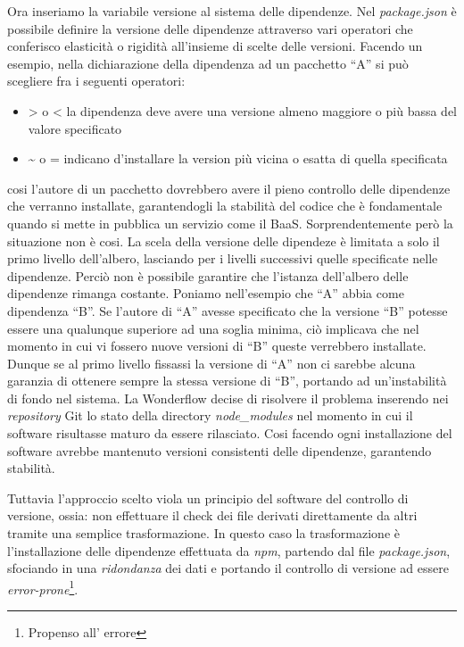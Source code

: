 Ora inseriamo la variabile versione al sistema delle dipendenze. Nel
\textit{package.json} è possibile definire la versione delle dipendenze
attraverso vari operatori che conferisco elasticità o rigidità all'insieme di
scelte delle versioni. Facendo un esempio, nella dichiarazione della dipendenza
ad un pacchetto ``A'' si può scegliere fra i seguenti operatori:
\begin{itemize}
  \item > o < la dipendenza deve avere una versione almeno maggiore o più bassa
  del valore specificato
  \item \~{} o = indicano d'installare la version più vicina o esatta di quella
  specificata
\end{itemize}
cosi l'autore di un pacchetto dovrebbero avere il pieno controllo delle
dipendenze che verranno installate, garantendogli la stabilità del codice che è
fondamentale quando si mette in pubblica un servizio come il \gls{BaaS}.
Sorprendentemente però la situazione non è cosi. La scela della versione delle
dipendeze è limitata a solo il primo livello dell'albero, lasciando per i
livelli successivi quelle specificate nelle dipendenze. Perciò non è possibile
garantire che l'istanza dell'albero delle dipendenze rimanga costante.
Poniamo nell'esempio che ``A'' abbia come dipendenza ``B''. Se l'autore di ``A''
avesse specificato che la versione ``B'' potesse essere una qualunque superiore
ad una soglia minima, ciò implicava che nel momento in cui vi fossero nuove
versioni di ``B'' queste verrebbero installate. Dunque se al primo livello
fissassi la versione di ``A'' non ci sarebbe alcuna garanzia di ottenere sempre
la stessa versione di ``B'', portando ad un'instabilità di fondo nel sistema.
La Wonderflow decise di risolvere il problema inserendo nei \textit{repository}
Git lo stato della directory \textit{node\_modules} nel momento in cui il
software risultasse maturo da essere rilasciato. Cosi facendo ogni installazione
del software avrebbe mantenuto versioni consistenti delle dipendenze, garantendo
stabilità.

Tuttavia l'approccio scelto viola un principio del software del controllo di
versione, ossia: non effettuare il \gls{check} dei file derivati direttamente da
altri tramite una semplice trasformazione. In questo caso la trasformazione è
l'installazione delle dipendenze effettuata da \textit{npm}, partendo dal file
\textit{package.json}, sfociando in una \textit{ridondanza} dei dati e portando
il controllo di versione ad essere \textit{error-prone}\footnote{Propenso all'
errore}.

